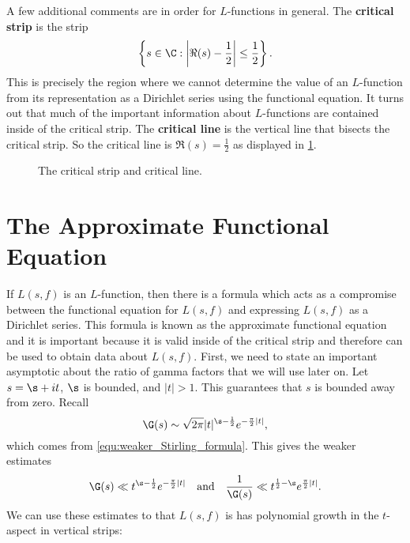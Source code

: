    A few additional comments are in order for $L$-functions in general. The \textbf{critical strip} is the strip
    \[
      \left\{s \in \C:\left|\Re(s)-\frac{1}{2}\right| \le \frac{1}{2}\right\}.
    \]
    This is precisely the region where we cannot determine the value of an $L$-function from its representation as a Dirichlet series using the functional equation. It turns out that much of the important information about $L$-functions are contained inside of the critical strip. The \textbf{critical line} is the vertical line that bisects the critical strip. So the critical line is $\Re(s) = \frac{1}{2}$ as displayed in \cref{fig:critical_strip}.

    \begin{figure}[ht]
      \centering
      \caption{The critical strip and critical line.}
      \label{fig:critical_strip}
    \end{figure}
  \section{The Approximate Functional Equation}
    If $L(s,f)$ is an $L$-function, then there is a formula which acts as a compromise between the functional equation for $L(s,f)$ and expressing $L(s,f)$ as a Dirichlet series. This formula is known as the approximate functional equation and it is important because it is valid inside of the critical strip and therefore can be used to obtain data about $L(s,f)$. First, we need to state an important asymptotic about the ratio of gamma factors that we will use later on. Let $s = \s+it$, $\s$ is bounded, and $|t| > 1$. This guarantees that $s$ is bounded away from zero. Recall
    \[
        \G(s) \sim \sqrt{2\pi}|t|^{\s-\frac{1}{2}}e^{-\frac{\pi}{2}|t|},
    \]
    which comes from \cref{equ:weaker_Stirling_formula}. This gives the weaker estimates
    \begin{equation}\label{equ:simplified_gamma_estimates}
      \G(s) \ll t^{\s-\frac{1}{2}}e^{-\frac{\pi}{2}|t|} \quad \text{and} \quad \frac{1}{\G(s)} \ll t^{\frac{1}{2}-\s}e^{\frac{\pi}{2}|t|} .
    \end{equation}
    We can use these estimates to that $L(s,f)$ is has polynomial growth in the $t$-aspect in vertical strips:

